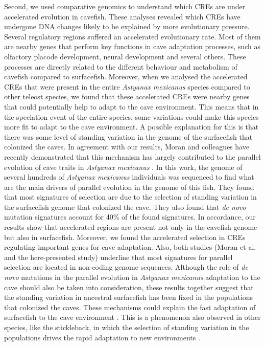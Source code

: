Second, we used comparative genomics to understand which CREs are under accelerated evolution in cavefish. These analyses revealed which CREs have undergone DNA changes likely to be explained by more evolutionary pressure.  Several regulatory regions suffered an accelerated evolutionary rate. Most of them are nearby genes that perform key functions in cave adaptation processes, such as olfactory placode development, neural development and several others. These processes are directly related to the different behaviour and metabolism of cavefish compared to surfacefish. Moreover, when we analysed the accelerated CREs that were present in the entire \textit{Astyanax mexicanus} species compared to other teleost species, we found that these accelerated CREs were nearby genes that could potentially help to adapt to the cave environment. This means that in the speciation event of the entire species, some variations could make this species more fit to adapt to the cave environment. A possible explanation for this is that there was some level of standing variation in the genome of the surfacefish that colonized the caves. In agreement with our results, Moran and colleagues have recently demonstrated that this mechanism has largely contributed to the parallel evolution of cave traits in \textit{Astyanax mexicanus} \parencite{moran_selection-driven_2023}. In this work, the genome of several hundreds of \textit{Astyanax mexicanus} individuals was sequenced to find what are the main drivers of parallel evolution in the genome of this fish. They found that most signatures of selection are due to the selection of standing variation in the surfacefish genome that colonized the cave. They also found that \textit{de novo} mutation signatures account for 40\% of the found signatures. In accordance, our results show that accelerated regions are present not only in the cavefish genome but also in surfacefish. Moreover, we found the accelerated selection in CREs regulating important genes for cave adaptation. Also, both studies (Moran et al. and the here-presented study) underline that most signatures for parallel selection are located in non-coding genome sequences. Although the role of \textit{de novo} mutations in the parallel evolution in \textit{Astyanax mexicanus} adaptation to the cave should also be taken into consideration, these results together suggest that the standing variation in ancestral surfacefish has been fixed in the populations that colonized the caves. These mechanisms could explain the fast adaptation of surfacefish to the cave environment \parencite{herman_role_2018}. This is a phenomenon also observed in other species, like the stickleback, in which the selection of standing variation in the populations drives the rapid adaptation to new environments \parencite{jones_genomic_2012, bassham_repeated_2018, reid_threespine_2021}.


